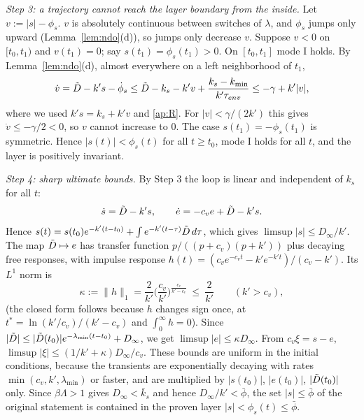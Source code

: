 \emph{Step 3: a trajectory cannot reach the layer boundary from the inside.} Let $v:=|s|-\phi_s$. $v$ is absolutely continuous between switches of $\lambda$, and $\phi_s$ jumps only upward (Lemma~\ref{lem:ndo}(d)), so jumps only decrease $v$. Suppose $v<0$ on $[t_0,t_1)$ and $v(t_1)=0$; say $s(t_1)=\phi_s(t_1)>0$. On $[t_0,t_1]$ mode I holds. By Lemma~\ref{lem:ndo}(d), almost everywhere on a left neighborhood of $t_1$,
\[
\dot v=\tilde{D}-k's-\dot\phi_s\le\tilde{D}-k_s-k'v+\frac{k_s-k_{\min}}{k'\tau_{env}}\le-\gamma+k'|v|,
\]
where we used $k's=k_s+k'v$ and \eqref{ap:R}. For $|v|<\gamma/(2k')$ this gives $\dot v\le-\gamma/2<0$, so $v$ cannot increase to $0$. The case $s(t_1)=-\phi_s(t_1)$ is symmetric. Hence $|s(t)|<\phi_s(t)$ for all $t\ge t_0$, mode I holds for all $t$, and the layer is positively invariant.

\emph{Step 4: sharp ultimate bounds.} By Step 3 the loop is linear and independent of $k_s$ for all $t$:
\begin{equation}
\dot s=\tilde{D}-k's,\qquad \dot e=-c_ve+\tilde{D}-k's.\label{ap:lin}
\end{equation}
Hence $s(t)=s(t_0)e^{-k'(t-t_0)}+\int e^{-k'(t-\tau)}\tilde{D}\,d\tau$, which gives $\limsup|s|\le D_\infty/k'$. The map $\tilde{D}\mapsto e$ has transfer function $p/((p+c_v)(p+k'))$ plus decaying free responses, with impulse response $h(t)=(c_ve^{-c_vt}-k'e^{-k't})/(c_v-k')$. Its $L^1$ norm is
\[
\kappa:=\|h\|_1=\frac{2}{k'}\Big(\frac{c_v}{k'}\Big)^{\frac{c_v}{k'-c_v}}\ \le\ \frac{2}{k'}\qquad(k'>c_v),
\]
(the closed form follows because $h$ changes sign once, at $t^\ast=\ln(k'/c_v)/(k'-c_v)$ and $\int_0^\infty h=0$). Since $|\tilde{D}|\le|\tilde{D}(t_0)|e^{-\lambda_{\min}(t-t_0)}+D_\infty$, we get $\limsup|e|\le\kappa D_\infty$. From $c_v\xi=s-e$, $\limsup|\xi|\le(1/k'+\kappa)D_\infty/c_v$. These bounds are uniform in the initial conditions, because the transients are exponentially decaying with rates $\min(c_v,k',\lambda_{\min})$ or faster, and are multiplied by $|s(t_0)|$, $|e(t_0)|$, $|\tilde{D}(t_0)|$ only. Since $\beta\Lambda>1$ gives $D_\infty<\bar k_s$ and hence $D_\infty/k'<\bar\phi$, the set $|s|\le\bar\phi$ of the original statement is contained in the proven layer $|s|<\phi_s(t)\le\bar\phi$.

